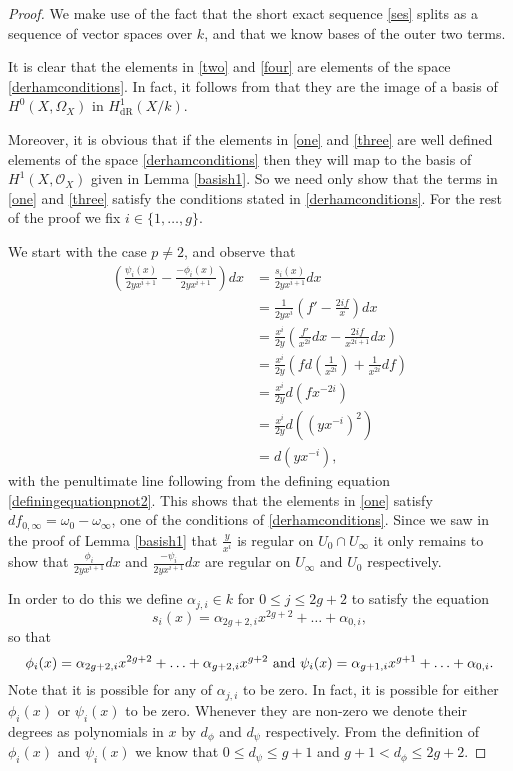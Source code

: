 \documentclass[draft, 11pt]{article} %
\theoremstyle{plain}
\theoremstyle{remark}
\newcommand{\hone}{H^1(X,\mathcal{O}_X)}
\newcommand{\derhamhone}{H_{\text {dR}}^1(X/k)}
\begin{document}
\begin{proof}
We make use of the fact that the short exact sequence \eqref{ses} splits as a sequence of vector spaces over $k$, and that we know bases of the outer two terms.

It is clear that the elements in \eqref{two} and \eqref{four} are elements of the space \eqref{derhamconditions}. 
In fact, it follows from \cite[Thm 6.1]{faithfulaction} that they are the image of a basis of $H^0(X,\Omega_X)$ in $\derhamhone$.

Moreover, it is obvious that if the elements in \eqref{one} and \eqref{three} are well defined elements of the space \eqref{derhamconditions} then they will map to the basis of $\hone$ given in Lemma \ref{basish1}.
So we need only show that the terms in \eqref{one} and \eqref{three} satisfy the conditions stated in \eqref{derhamconditions}.
For the rest of the proof we fix $i \in \{1, \ldots ,g\}$.


We start with the case $p\neq 2$, and observe that
\begin{align*}
\left(  \frac{\psi_i(x)}{2yx^{i+1}}  - \frac{-\phi_i(x)}{2yx^{i+1}} \right) dx & =  \frac{s_i(x)}{2yx^{i+1}} dx \\
& =  \frac{1}{2yx^i} \left( f' - \frac{2if}{x} \right) dx \\
& =  \frac{x^i}{2y} \left( \frac{f'}{x^{2i}}dx -\frac{2if}{x^{2i+1}} dx \right) \\
& =  \frac{x^i}{2y} \left( fd\left(\frac{1}{x^{2i}}\right) + \frac{1}{x^{2i}}df \right) \\
& =  \frac{x^i}{2y}d(fx^{-2i}) \\
& =  \frac{x^i}{2y} d\left(\left(yx^{-i}\right)^2\right) \\
& =  d(yx^{-i}),
\end{align*}
with the penultimate line following from the defining equation \eqref{definingequationpnot2}.
This shows that the elements in \eqref{one} satisfy $df_{0, \infty} = \omega_0 - \omega_\infty$, one of the conditions of \eqref{derhamconditions}.
Since we saw in the proof of Lemma \ref{basish1} that $\frac{y}{x^i}$ is regular on $U_0\cap U_\infty$ it only remains to show that $\frac{\phi_i}{2yx^{i+1}}dx$ and $\frac{-\psi_i}{2yx^{i+1}}dx$ are regular on $U_\infty$ and $U_0$ respectively.


In order to do this we define $\alpha_{j,i} \in k$ for $0\leq j \leq 2g+2$ to satisfy the equation
\[
s_i(x) = \alpha_{2g+2,i}x^{2g+2} + \ldots + \alpha_{0,i},
\]
so that
\[
\phi_i(x) = \alpha_{2g+2,i}x^{2g+2} + \ldots + \alpha_{g+2,i}x^{g+2} \ {\rm and } \ \psi_i(x) = \alpha_{g+1,i}x^{g+1} + \ldots + \alpha_{0,i}.
\]
Note that it is possible for any of $\alpha_{j,i}$ to be zero. In fact, it is possible for either $\phi_i(x)$ or $\psi_i(x)$ to be zero.
Whenever they are non-zero we denote their degrees as polynomials in $x$ by $d_\phi$ and $d_\psi$ respectively. From the definition of $\phi_i(x)$ and $\psi_i(x)$ we know that $0 \leq d_\psi \leq g+1$ and $g+1 < d_\phi \leq 2g+2$.



\end{proof}
\end{document}
